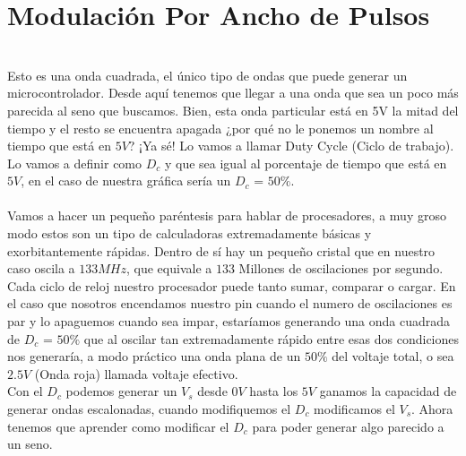 \documentclass[]{article}
\begin{document}
\section*{Modulación Por Ancho de Pulsos}
\\
Esto es una onda cuadrada, el único tipo de ondas que puede generar un microcontrolador. Desde aquí tenemos que llegar a una onda que sea un poco más parecida al seno que buscamos. Bien, esta onda particular está en 5V la mitad del tiempo y el resto se encuentra apagada ¿por qué no le ponemos un nombre al tiempo que está en $5V$? ¡Ya sé! Lo vamos a llamar Duty Cycle (Ciclo de trabajo). Lo vamos a definir como $D_{c}$ y que sea igual al porcentaje de tiempo que está en $5V$, en el caso de nuestra gráfica sería un $D_{c}$ = $50\%$.\\\\
Vamos a hacer un pequeño paréntesis para hablar de procesadores, a muy groso modo estos son un tipo de calculadoras extremadamente básicas y exorbitantemente rápidas. Dentro de sí hay un pequeño cristal que en nuestro caso oscila a $133 MHz$, que equivale a $133$ Millones de oscilaciones por segundo. Cada ciclo de reloj nuestro procesador puede tanto sumar, comparar o cargar. En el caso que nosotros encendamos nuestro pin cuando el numero de oscilaciones es par y lo apaguemos cuando sea impar, estaríamos generando una onda cuadrada de $D_c$ = $50\%$ que al oscilar tan extremadamente rápido entre esas dos condiciones nos generaría, a modo práctico una onda plana de un $50\%$ del voltaje total, o sea $2.5V$ (Onda roja) llamada voltaje efectivo.\\
Con el $D_c$ podemos generar un $V_s$ desde $0V$ hasta los $5V$ ganamos la capacidad de generar ondas escalonadas, cuando modifiquemos el $D_c$ modificamos el $V_s$. Ahora tenemos que aprender como modificar el $D_c$ para poder generar algo parecido a un seno.
\end{document}
